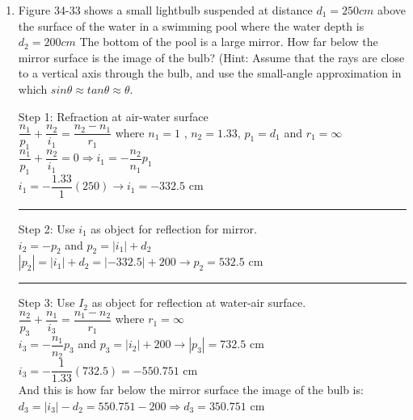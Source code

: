 \documentclass[fleqn]{article}
\begin{document}
  \begin{enumerate}
    \item Figure 34-33 shows a small lightbulb suspended at distance $d_1=250 cm$ above the surface of the water in a swimming pool where the water depth is $d_2=200 cm$ The bottom of the pool is a large mirror. How far below the mirror surface is the image of the bulb? (Hint: Assume that the rays are close to a vertical axis through the bulb, and use the small-angle approximation in which $sin\theta \approx tan \theta \approx \theta $.

    \textcolor{hwColor}{
      Step 1: Refraction at air-water surface \\
      $\dfrac{n_1}{p_1}+\dfrac{n_2}{i_1}=\dfrac{n_2-n_1}{r_1}$ where $n_1=1$ , $n_2=1.33$, $p_1=d_1$ and $r_1=\infty$ \\
      $\dfrac{n_1}{p_1}+\dfrac{n_2}{i_1}=0 \Longrightarrow i_1=-\dfrac{n_2}{n_1}p_1$ \\
      $i_1=-\dfrac{1.33}{1}(250) \rightarrow i_1=-332.5$ cm \\
    }

    \textcolor{hwColor}{
      \rule{15cm}{0.4pt}
    }

    \textcolor{hwColor}{
      Step 2: Use $i_1$ as object for reflection for mirror. \\
      $i_2=-p_2$ and $p_2=|i_1|+d_2$ \\
      $|p_2|=|i_1|+d_2=|-332.5|+200 \rightarrow p_2=532.5$ cm \\
    }

    \textcolor{hwColor}{
      \rule{15cm}{0.4pt}
    }

    \textcolor{hwColor}{
      Step 3: Use $I_2$ as object for reflection at water-air surface. \\
      $\dfrac{n_2}{p_3}+\dfrac{n_1}{i_3}=\dfrac{n_1-n_2}{r_1}$ where $r_1=\infty$ \\
      $i_3=-\dfrac{n_1}{n_2}p_3$ and $p_3=|i_2|+200 \rightarrow |p_3|=732.5$ cm \\
      $i_3=-\dfrac{1}{1.33}(732.5)=−550.751$ cm \\
      \bigbreak
      And this is how far below the mirror surface the image of the bulb is: \\
      $d_3=|i_3|-d_2=550.751-200 \Longrightarrow d_3=350.751$ cm
    }


\end{enumerate}
\end{document}
